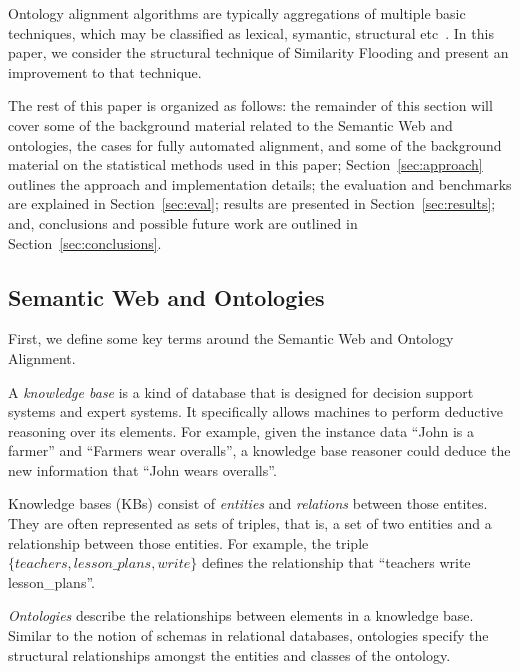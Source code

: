 \documentclass[letterpaper,twocolumn,12pt]{article}
\begin{document}
Ontology alignment algorithms are typically aggregations of multiple basic techniques, which may be classified as lexical, symantic, structural etc~\cite{euzenat:2007:ontology}.
In this paper, we consider the structural technique of Similarity Flooding and present an improvement to that technique.

\noindent The rest of this paper is organized as follows: 
the remainder of this section will cover some of the background material related to the Semantic Web and ontologies, the cases for fully automated alignment, and some of the background material on the statistical methods used in this paper; 
Section~\ref{sec:approach} outlines the approach and implementation details; 
the evaluation and benchmarks are explained in Section~\ref{sec:eval}; 
results are presented in Section~\ref{sec:results}; and, 
conclusions and possible future work are outlined in Section~\ref{sec:conclusions}.

\subsection{Semantic Web and Ontologies}
\label{subsec:semanticweb}
First, we define some key terms around the Semantic Web and Ontology Alignment.

A \textit{knowledge base} is a kind of database that is designed for decision support systems and expert systems. 
It specifically allows machines to perform deductive reasoning over its elements.
For example, given the instance data ``John is a farmer'' and ``Farmers wear overalls'', a knowledge base reasoner could deduce the new information that ``John wears overalls''.

Knowledge bases (KBs) consist of \textit{entities} and \textit{relations} between those entites. 
They are often represented as sets of triples, that is, a set of two entities and a relationship between those entities. 
For example, the triple ${\{teachers, lesson\_plans, write\}}$ defines the relationship that ``teachers write lesson\_plans''.

\textit{Ontologies} describe the relationships between elements in a knowledge base.
Similar to the notion of schemas in relational databases, ontologies specify the structural relationships amongst the entities and classes of the ontology.
\end{document}
